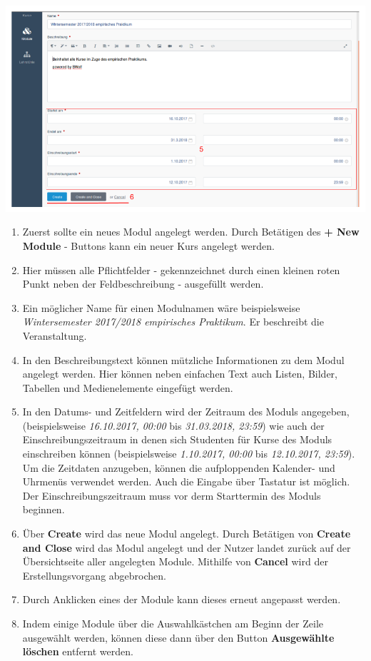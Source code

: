     \includegraphics[scale=0.3]{backend/img/module_3.png}
    
    \begin{enumerate}
    \item Zuerst sollte ein neues Modul angelegt werden. Durch Betätigen des \textbf{+ New Module} - Buttons kann ein neuer Kurs angelegt werden.
    \item Hier müssen alle Pflichtfelder - gekennzeichnet durch einen kleinen roten Punkt neben der Feldbeschreibung - ausgefüllt werden.
    \item Ein möglicher Name für einen Modulnamen wäre beispielsweise \textit{Wintersemester 2017/2018 empirisches Praktikum}. Er beschreibt die Veranstaltung.
    \item In den Beschreibungstext können mützliche Informationen zu dem Modul angelegt werden.
	  Hier können neben einfachen Text auch Listen, Bilder, Tabellen und Medienelemente eingefügt werden.
    \item In den Datums- und Zeitfeldern wird der Zeitraum des Moduls angegeben, (beispielsweise \textit{16.10.2017, 00:00} bis \textit{31.03.2018, 23:59}) 
	  wie auch der Einschreibungszeitraum in denen sich Studenten für Kurse des Moduls einschreiben können (beispielsweise \textit{1.10.2017, 00:00} bis \textit{12.10.2017, 23:59}).
	  Um die Zeitdaten anzugeben, können die aufploppenden Kalender- und Uhrmenüs verwendet werden. Auch die Eingabe über Tastatur ist möglich.
	  Der Einschreibungszeitraum muss vor derm Starttermin des Moduls beginnen.
    \item Über \textbf{Create} wird das neue Modul angelegt. 
	  Durch Betätigen von \textbf{Create and Close} wird das Modul angelegt und der Nutzer landet zurück auf der Übersichtseite aller angelegten Module.
	  Mithilfe von \textbf{Cancel} wird der Erstellungsvorgang abgebrochen.
    \item Durch Anklicken eines der Module kann dieses erneut angepasst werden.
    \item Indem einige Module über die Auswahlkästchen am Beginn der Zeile ausgewählt werden, können diese dann über den Button \textbf{Ausgewählte löschen} entfernt werden.
    \end{enumerate}
    
